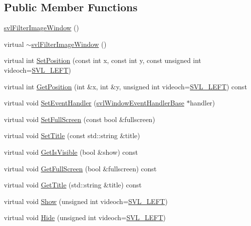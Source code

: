 \subsection*{Public Member Functions}
\begin{DoxyCompactItemize}
\item 
\hyperlink{classsvl_filter_image_window_a847d2399da203ee78a5ae00f1d3f3d9a}{svl\-Filter\-Image\-Window} ()
\item 
virtual \hyperlink{classsvl_filter_image_window_aa81cb54a181f6a91df255fc82e22cfcd}{$\sim$svl\-Filter\-Image\-Window} ()
\item 
virtual int \hyperlink{classsvl_filter_image_window_a28c6aa750e0f27ed40569ff06384df55}{Set\-Position} (const int x, const int y, const unsigned int videoch=\hyperlink{svl_definitions_8h_ab9fec7615f19c8df2919eebcab0b187f}{S\-V\-L\-\_\-\-L\-E\-F\-T})
\item 
virtual int \hyperlink{classsvl_filter_image_window_abc6056097913c5bde5b05ad0d014cafb}{Get\-Position} (int \&x, int \&y, unsigned int videoch=\hyperlink{svl_definitions_8h_ab9fec7615f19c8df2919eebcab0b187f}{S\-V\-L\-\_\-\-L\-E\-F\-T}) const 
\item 
virtual void \hyperlink{classsvl_filter_image_window_a1558def4df8d3eac8ef9010471510d90}{Set\-Event\-Handler} (\hyperlink{classsvl_window_event_handler_base}{svl\-Window\-Event\-Handler\-Base} $\ast$handler)
\item 
virtual void \hyperlink{classsvl_filter_image_window_a3810e3d49643e4310fcd9f10fb54d40f}{Set\-Full\-Screen} (const bool \&fullscreen)
\item 
virtual void \hyperlink{classsvl_filter_image_window_adbdf54ba426a39fca253a1a053e4ac9a}{Set\-Title} (const std\-::string \&title)
\item 
virtual void \hyperlink{classsvl_filter_image_window_aed9946114ccf3dcf437d1ad5814d353a}{Get\-Is\-Visible} (bool \&show) const 
\item 
virtual void \hyperlink{classsvl_filter_image_window_a211c3d80d674cff53206c771638b3b68}{Get\-Full\-Screen} (bool \&fullscreen) const 
\item 
virtual void \hyperlink{classsvl_filter_image_window_ad989c27c31f3ed47da7512af4b0babdd}{Get\-Title} (std\-::string \&title) const 
\item 
virtual void \hyperlink{classsvl_filter_image_window_aa0d8485450ddfd2ed3cff360411d07ef}{Show} (unsigned int videoch=\hyperlink{svl_definitions_8h_ab9fec7615f19c8df2919eebcab0b187f}{S\-V\-L\-\_\-\-L\-E\-F\-T})
\item 
virtual void \hyperlink{classsvl_filter_image_window_a0b73ccfe47ae433f8e7c52225adff2db}{Hide} (unsigned int videoch=\hyperlink{svl_definitions_8h_ab9fec7615f19c8df2919eebcab0b187f}{S\-V\-L\-\_\-\-L\-E\-F\-T})
\end{DoxyCompactItemize}
